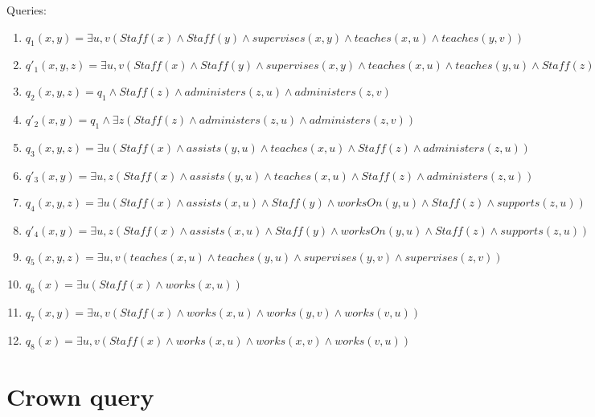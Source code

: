 \documentclass{article}
\begin{document}
Queries:
%
\begin{enumerate}
\item $q_1(x,y) = \exists u,v (Staff(x) \land Staff(y) \land supervises(x,y) \land teaches(x,u) \land teaches(y,v))$

\item $q'_1(x,y,z) = \exists u,v (Staff(x) \land Staff(y) \land supervises(x,y) \land teaches(x,u) \land teaches(y,u) \land Staff(z) \land manages(z,v) \land manages(y,v))$


\item $q_2(x,y,z) = q_1 \land Staff(z) \land administers(z,u) \land administers(z,v)$

\item $q'_2(x,y) = q_1 \land \exists z (Staff(z) \land administers(z,u) \land administers(z,v))$

\item $q_3(x,y,z) = \exists u (Staff(x) \land assists(y,u) \land teaches(x,u) \land Staff(z) \land administers(z,u))$

\item $q'_3(x,y) = \exists u,z (Staff(x) \land assists(y,u) \land teaches(x,u) \land Staff(z) \land administers(z,u))$

\item $q_4(x,y,z) = \exists u( Staff(x) \land assists(x,u) \land Staff(y) \land worksOn(y,u) \land Staff(z) \land supports(z,u)
)$

\item $q'_4(x,y) = \exists u,z( Staff(x) \land assists(x,u) \land Staff(y) \land worksOn(y,u) \land Staff(z) \land supports(z,u)
)$

\item $q_5(x,y,z) = \exists u,v(teaches (x,u) \land teaches(y,u) \land supervises(y,v) \land supervises(z,v))$

\item $q_6(x) = \exists u (Staff(x) \land works (x,u))$

\item $q_7(x,y) = \exists u,v (Staff(x) \land works (x,u) \land works (y,v) \land works (v,u))$

\item $q_8(x) = \exists u,v (Staff(x) \land works (x,u) \land works (x,v) \land works (v,u))$
\end{enumerate}


\section{Crown query}
\end{document}
